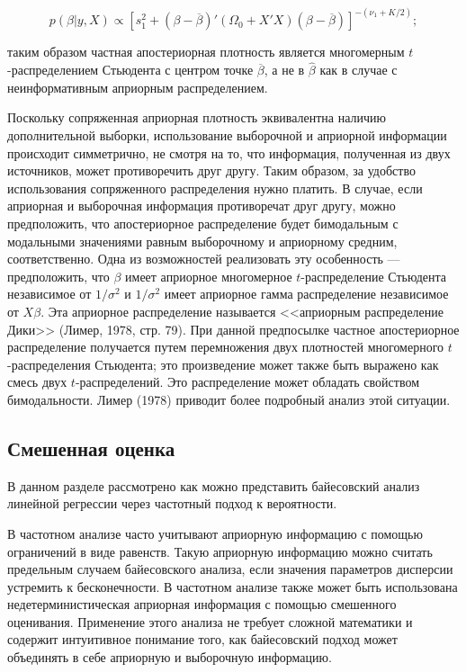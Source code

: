 \begin{equation}
p(\beta|y,X){\propto}\left[s^2_1+(\beta-\overline{\beta})'(\Omega_0+X'X)(\beta-\overline{\beta})\right]^{-(\nu_1+K/2)};
\end{equation}

таким образом частная апостериорная плотность является многомерным $t$-распределением Стьюдента с центром точке $\overline{\beta}$, а не в $\hat{\beta}$ как в случае с неинформативным априорным распределением.

Поскольку сопряженная априорная плотность эквивалентна наличию дополнительной выборки, использование выборочной и априорной информации происходит симметрично, не смотря на то, что информация, полученная из двух источников, может противоречить друг другу. 
Таким образом, за удобство использования сопряженного распределения нужно платить. 
В случае, если априорная и выборочная информация противоречат друг другу, можно предположить, что апостериорное распределение будет бимодальным с модальными значениями равным выборочному и априорному средним, соответственно. 
Одна из возможностей реализовать эту особенность --- предположить, что $\beta$ имеет априорное многомерное $t$-распределение Стьюдента независимое от $1/\sigma^2$ и $1/\sigma^2$ имеет априорное гамма распределение независимое от $X\beta$. Эта априорное распределение называется <<априорным распределение Дики>> (Лимер, 1978, стр. 79). При данной предпосылке частное  апостериорное распределение получается путем перемножения двух плотностей многомерного $t$-распределения Стьюдента; это произведение может также быть выражено как смесь двух  $t$-распределений. Это распределение может обладать свойством бимодальности. Лимер (1978) приводит более подробный анализ этой ситуации.

\subsection{Смешенная оценка}

В данном разделе рассмотрено как можно представить байесовский анализ линейной регрессии через частотный подход к вероятности. 

В частотном анализе часто учитывают априорную информацию с помощью ограничений в виде равенств. Такую априорную информацию можно считать предельным случаем байесовского анализа, если значения параметров дисперсии устремить к бесконечности. В частотном анализе также может быть использована недетерминистическая априорная информация с помощью  смешенного оценивания. Применение этого анализа не требует сложной математики и содержит интуитивное понимание того, как байесовский подход может объединять в себе априорную и выборочную информацию. 

